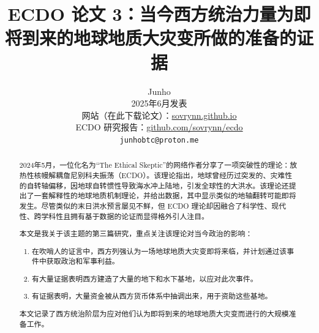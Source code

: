 \documentclass[10pt,twocolumn,letterpaper]{article}
\begin{document}
\title{ECDO 论文 3：当今西方统治力量为即将到来的地球地质大灾变所做的准备的证据}

\author{Junho\\
2025年6月发表\\
网站（在此下载论文）：\href{https://sovrynn.github.io}{sovrynn.github.io}\\
ECDO 研究报告：\href{https://github.com/sovrynn/ecdo}{github.com/sovrynn/ecdo}\\
{\tt\small junhobtc@proton.me}
}

\maketitle

\begin{abstract}
2024年5月，一位化名为“The Ethical Skeptic”的网络作者\cite{0}分享了一项突破性的理论：放热性核幔解耦詹尼别科夫振荡（ECDO）\cite{1}。该理论指出，地球曾经历过突发的、灾难性的自转轴偏移，因地球自转惯性导致海水冲上陆地，引发全球性的大洪水。该理论还提出了一套解释性的地球地质机制理论，并给出数据，其中显示类似的地轴翻转可能即将发生。尽管类似的末日洪水预言屡见不鲜，但 ECDO 理论却因融合了科学性、现代性、跨学科性且拥有基于数据的论证而显得格外引人注目。

本文是我关于该主题的第三篇研究\cite{2,3}，重点关注该理论对当今政治的影响：

\begin{flushleft}
\begin{enumerate}
    \item 在吹哨人的证言中，西方列强认为一场地球地质大灾变即将来临，并计划通过该事件中获取政治和军事利益。
    \item 有大量证据表明西方建造了大量的地下和水下基地，以应对此次事件。
    \item 有证据表明，大量资金被从西方货币体系中抽调出来，用于资助这些基地。
\end{enumerate}
\end{flushleft}

本文记录了西方统治阶层为应对他们认为即将到来的地球地质大灾变而进行的大规模准备工作。
\end{abstract}
\end{document}
